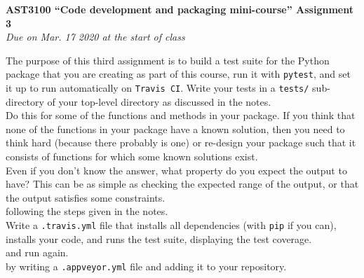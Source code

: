 \documentclass[12pt]{article}
\begin{document}
\begin{center}
{\bf \LARGE AST3100 ``Code development and packaging mini-course'' Assignment 3}\\[7pt]
\emph{Due on Mar. 17 2020  at the start of class}\\[7pt]
\end{center}

The purpose of this third assignment is to build a test suite for the
Python package that you are creating as part of this course, run it
with \texttt{pytest}, and set it up to run automatically on
\texttt{Travis CI}. Write your tests in a \texttt{tests/}
sub-directory of your top-level directory as discussed in the notes.\\

 Do this for some of the functions and methods in your
package. If you think that none of the functions in your package have
a known solution, then you need to think hard (because there probably
is one) or re-design your package such that it consists of functions
for which some known solutions exist.\\

 Even if you don't know the answer,
what property do you expect the output to have? This can be as simple
as checking the expected range of the output, or that the output
satisfies some constraints.\\

 following the steps given in the notes.\\

 Write a
\texttt{.travis.yml} file that installs all dependencies (with
\texttt{pip} if you can), installs your code, and runs the test suite,
displaying the test coverage.\\

 and run again.\\

 by writing a \texttt{.appveyor.yml} file and adding
it to your repository.\\
\end{document}
